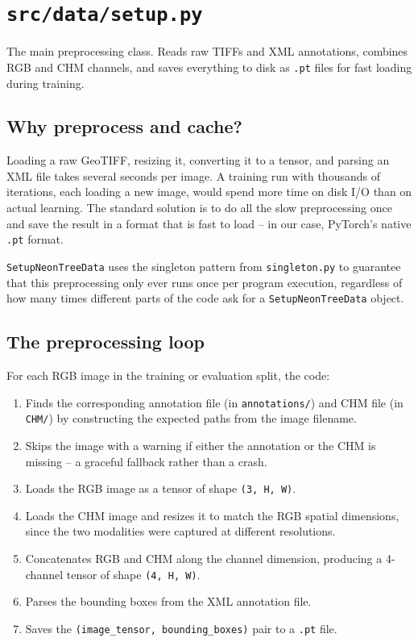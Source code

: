 \documentclass[11pt, a4paper]{article}
\newenvironment{filebox}[1]{%
  \begin{tcolorbox}[
    colback=filebg, colframe=fileframe,
    fonttitle=\bfseries\ttfamily, title=#1,
    breakable, enhanced
  ]
}{%
  \end{tcolorbox}
}
\begin{document}
\section{\texttt{src/data/setup.py}}
\label{sec:setup}

\begin{filebox}{src/data/setup.py}
  The main preprocessing class. Reads raw TIFFs and XML annotations, combines
  RGB and CHM channels, and saves everything to disk as \texttt{.pt} files for
  fast loading during training.
\end{filebox}

\subsection{Why preprocess and cache?}

Loading a raw GeoTIFF, resizing it, converting it to a tensor, and parsing an
XML file takes several seconds per image. A training run with thousands of
iterations, each loading a new image, would spend more time on disk I/O than
on actual learning. The standard solution is to do all the slow preprocessing
once and save the result in a format that is fast to load -- in our case,
PyTorch's native \texttt{.pt} format.

\texttt{SetupNeonTreeData} uses the singleton pattern from
\texttt{singleton.py} to guarantee that this preprocessing only ever runs once
per program execution, regardless of how many times different parts of the code
ask for a \texttt{SetupNeonTreeData} object.

\subsection{The preprocessing loop}

For each RGB image in the training or evaluation split, the code:

\begin{enumerate}
  \item Finds the corresponding annotation file (in \texttt{annotations/}) and
        CHM file (in \texttt{CHM/}) by constructing the expected paths from the
        image filename.
  \item Skips the image with a warning if either the annotation or the CHM is
        missing -- a graceful fallback rather than a crash.
  \item Loads the RGB image as a tensor of shape \texttt{(3, H, W)}.
  \item Loads the CHM image and resizes it to match the RGB spatial dimensions,
        since the two modalities were captured at different resolutions.
  \item Concatenates RGB and CHM along the channel dimension, producing a
        4-channel tensor of shape \texttt{(4, H, W)}.
  \item Parses the bounding boxes from the XML annotation file.
  \item Saves the \texttt{(image\_tensor, bounding\_boxes)} pair to a
        \texttt{.pt} file.
\end{enumerate}
\end{document}
